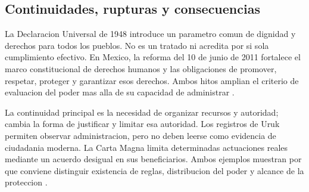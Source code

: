 \documentclass[spanish,letterpaper,oneside]{article}
\begin{document}
\begin{landscape}
\begin{images}[\label{fig:linea-estado}]
{
}
\end{images}
\endgroup
\end{landscape}

\subsection{Continuidades, rupturas y consecuencias}

La Declaracion Universal de 1948 introduce un parametro comun de
dignidad y derechos para todos los pueblos. No es un tratado ni acredita
por si sola cumplimiento efectivo. En Mexico, la reforma del 10 de junio
de 2011 fortalece el marco constitucional de derechos humanos y las
obligaciones de promover, respetar, proteger y garantizar esos derechos.
Ambos hitos amplian el criterio de evaluacion del poder mas alla de su
capacidad de administrar \citep{onu1948S2,garciaRicci2011,cpeum2026S2}.

La continuidad principal es la necesidad de organizar recursos y
autoridad; cambia la forma de justificar y limitar esa autoridad.
Los registros de Uruk permiten observar administracion, pero no deben
leerse como evidencia de ciudadania moderna. La Carta Magna limita
determinadas actuaciones reales mediante un acuerdo desigual en sus
beneficiarios. Ambos ejemplos muestran por que conviene distinguir
existencia de reglas, distribucion del poder y alcance de la proteccion
\citep{metUruk2003,parliamentMagnaCarta}.
\end{document}
